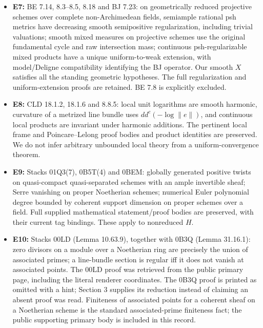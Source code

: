 \documentclass[
  10pt,
]{article}
\begin{document}
\begin{itemize}
  measures give zero mass to negligible Borel sets under the standing
  ample EP. The complete pertinent proofs are preserved. Output finite
  dual energy comes from G0.
\item
  \textbf{E7:} BE 7.14, 8.3--8.5, 8.18 and BJ 7.23: on geometrically
  reduced projective schemes over complete non-Archimedean fields,
  semiample rational psh metrics have decreasing smooth semipositive
  regularization, including trivial valuations; smooth mixed measures on
  projective schemes use the original fundamental cycle and raw
  intersection mass; continuous psh-regularizable mixed products have a
  unique uniform-to-weak extension, with model/Deligne compatibility
  identifying the BJ operator. Our smooth \(X\) satisfies all the
  standing geometric hypotheses. The full regularization and
  uniform-extension proofs are retained. BE 7.8 is explicitly excluded.
\item
  \textbf{E8:} CLD 18.1.2, 18.1.6 and 8.8.5: local unit logarithms are
  smooth harmonic, curvature of a metrized line bundle uses
  \(dd^c(-\log\|e\|)\), and continuous local products are invariant
  under harmonic additions. The pertinent local frame and
  Poincare--Lelong proof bodies and product identities are preserved. We
  do not infer arbitrary unbounded local theory from a
  uniform-convergence theorem.
\item
  \textbf{E9:} Stacks 01Q3(7), 0B5T(4) and 0BEM: globally generated
  positive twists on quasi-compact quasi-separated schemes with an ample
  invertible sheaf; Serre vanishing on proper Noetherian schemes;
  numerical Euler polynomial degree bounded by coherent support
  dimension on proper schemes over a field. Full supplied mathematical
  statement/proof bodies are preserved, with their current tag bindings.
  These apply to nonreduced \(H\).
\item
  \textbf{E10:} Stacks 00LD (Lemma 10.63.9), together with 0B3Q (Lemma
  31.16.1): zero divisors on a module over a Noetherian ring are
  precisely the union of associated primes; a line-bundle section is
  regular iff it does not vanish at associated points. The 00LD proof
  was retrieved from the public primary page, including the literal
  renderer coordinates. The 0B3Q proof is printed as omitted with a
  hint; Section 3 supplies its reduction instead of claiming an absent
  proof was read. Finiteness of associated points for a coherent sheaf
  on a Noetherian scheme is the standard associated-prime finiteness
  fact; the public supporting primary body is included in this record.
\end{itemize}
\end{document}
